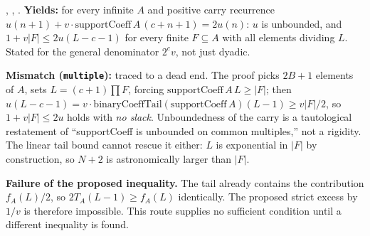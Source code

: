 \begin{obs} 
,
,
.
\textbf{Yields:} for every infinite $A$ and positive carry recurrence
$u(n{+}1)+v\cdot\mathrm{supportCoeff}\,A\,(c{+}n{+}1)=2u(n)$: $u$ is unbounded, and $1+v|F| \le
2u(L{-}c{-}1)$ for every finite $F\subseteq A$ with all elements dividing $L$. Stated for the
general denominator $2^c v$, not just dyadic.

\par\medskip

\textbf{Mismatch (\texttt{multiple}):} traced to a dead end. The proof picks $2B{+}1$ elements of
$A$, sets $L=(c{+}1)\prod F$, forcing $\mathrm{supportCoeff}\,A\,L\ge|F|$; then
$u(L{-}c{-}1)=v\cdot\mathrm{binaryCoeffTail}(\mathrm{supportCoeff}\,A)(L{-}1)\ge v|F|/2$, so $1+v|F|
\le 2u$ holds with \emph{no slack}. Unboundedness of the carry is a tautological restatement of
``supportCoeff is unbounded on common multiples,'' not a rigidity. The linear tail bound cannot
rescue it either: $L$ is exponential in $|F|$ by construction, so $N{+}2$ is astronomically
larger than $|F|$.

\par\medskip

\textbf{Failure of the proposed inequality.} The tail already contains the contribution
$f_A(L)/2$, so $2T_A(L-1)\ge f_A(L)$ identically. The proposed strict excess by $1/v$ is therefore
impossible. This route supplies no sufficient condition until a different inequality is found.
\end{obs}

